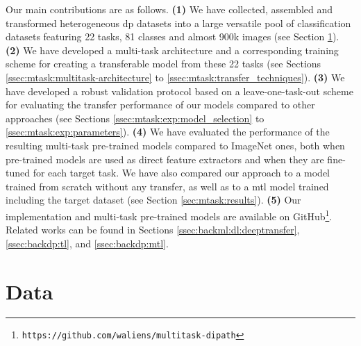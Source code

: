 Our main contributions are as follows. \textbf{(1)} We have collected, assembled and transformed heterogeneous \acrlong{dp} datasets into a large versatile pool of classification datasets featuring 22 tasks, 81 classes and almost 900k images (see Section \ref{sec:mtask:data}). \textbf{(2)} We have developed a multi-task architecture and a corresponding training scheme for creating a transferable model from these 22 tasks (see Sections \ref{ssec:mtask:multitask-architecture} to \ref{ssec:mtask:transfer_techniques}). \textbf{(3)} We have developed a robust validation protocol based on a leave-one-task-out scheme for evaluating the transfer performance of our models compared to other approaches (see Sections \ref{ssec:mtask:exp:model_selection} to \ref{ssec:mtask:exp:parameters}). \textbf{(4)} We have evaluated the performance of the resulting multi-task pre-trained models compared to ImageNet ones, both when pre-trained models are used as direct feature extractors and when they are fine-tuned for each target task. We have also compared our approach to a model trained from scratch without any transfer, as well as to a \acrshort{mtl} model trained including the target dataset (see Section \ref{sec:mtask:results}). \textbf{(5)} Our implementation and multi-task pre-trained models are available on GitHub\footnote{\texttt{https://github.com/waliens/multitask-dipath}}. Related works can be found in Sections \ref{ssec:backml:dl:deeptransfer}, \ref{ssec:backdp:tl}, and \ref{ssec:backdp:mtl}.  

\section{Data}
\label{sec:mtask:data}


